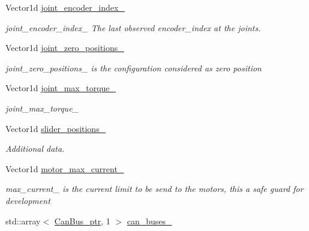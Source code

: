 \begin{DoxyCompactItemize}
Vector1d \hyperlink{classblmc__robots_1_1SingleMotor_ae993e954e97662c1381d72e015035ca6}{joint\+\_\+encoder\+\_\+index\+\_\+}
\begin{DoxyCompactList}\small\item\em joint\+\_\+encoder\+\_\+index\+\_\+ The last observed encoder\+\_\+index at the joints. \end{DoxyCompactList}\item 
\mbox{\label{classblmc__robots_1_1SingleMotor_afe177b30fe7465e605165c25f9f7e10e}} 
Vector1d \hyperlink{classblmc__robots_1_1SingleMotor_afe177b30fe7465e605165c25f9f7e10e}{joint\+\_\+zero\+\_\+positions\+\_\+}
\begin{DoxyCompactList}\small\item\em joint\+\_\+zero\+\_\+positions\+\_\+ is the configuration considered as zero position \end{DoxyCompactList}\item 
\mbox{\label{classblmc__robots_1_1SingleMotor_a30e231807cc6d74d52b40388f1cc2209}} 
Vector1d \hyperlink{classblmc__robots_1_1SingleMotor_a30e231807cc6d74d52b40388f1cc2209}{joint\+\_\+max\+\_\+torque\+\_\+}
\begin{DoxyCompactList}\small\item\em joint\+\_\+max\+\_\+torque\+\_\+ \end{DoxyCompactList}\item 
Vector1d \hyperlink{classblmc__robots_1_1SingleMotor_a15774ca374fff212abe4d2b397263dc9}{slider\+\_\+positions\+\_\+}
\begin{DoxyCompactList}\small\item\em Additional data. \end{DoxyCompactList}\item 
\mbox{\label{classblmc__robots_1_1SingleMotor_a581cc65baa0d38dbe0dc63ff682da4cb}} 
Vector1d \hyperlink{classblmc__robots_1_1SingleMotor_a581cc65baa0d38dbe0dc63ff682da4cb}{motor\+\_\+max\+\_\+current\+\_\+}
\begin{DoxyCompactList}\small\item\em max\+\_\+current\+\_\+ is the current limit to be send to the motors, this a safe guard for development \end{DoxyCompactList}\item 
std\+::array$<$ \hyperlink{common__header_8hpp_a793c8789a7598e8aaf766939da7262af}{Can\+Bus\+\_\+ptr}, 1 $>$ \hyperlink{classblmc__robots_1_1SingleMotor_a6a57409cef4dc0959ed6b442e7626ba2}{can\+\_\+buses\+\_\+}

\end{DoxyCompactItemize}
